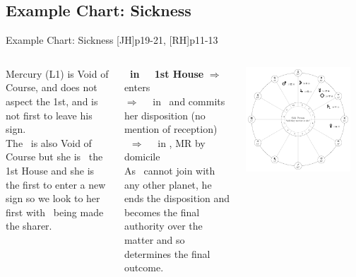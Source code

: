 \subsection{Example Chart: Sickness}
\begin{frame}[t]{Example Chart: Sickness [JH]p19-21, [RH]p11-13 }

\begin{columns}[T, onlytextwidth]
Mercury (L1) is Void of Course, and does not aspect the 1st, and is not first to leave his sign. \\
\vspace{0.2cm}
The \Moon\ is also Void of Course but she is \Trine\ the 1st House and she is the first to enter a new sign so we look to her first with \Mercury\ being made the sharer. \\
\vspace{0.2cm}

\textbf{\Moon\ in \Taurus\ \Trine\ 1st House} $\Rightarrow$ enters \Gemini \\
$\Rightarrow$ \Square\ \Venus\ in \Pisces\ and commits her disposition (no mention of reception) \\
\Venus\ $\Rightarrow$ \Sextile\ \Jupiter\ in \Taurus, MR by domicile \\
\vspace{0.2cm}
As \Jupiter\ cannot join with any other planet\footnotemark[1], he ends the disposition and becomes the final authority over the matter and so determines the final outcome.
\vspace{0.2cm}

\begin{center}
{\includegraphics[width=0.9\textwidth]{charts/21-chart-sickness}} \\
\vspace{-0.2cm}
\end{center}
\end{columns}
\end{frame}
